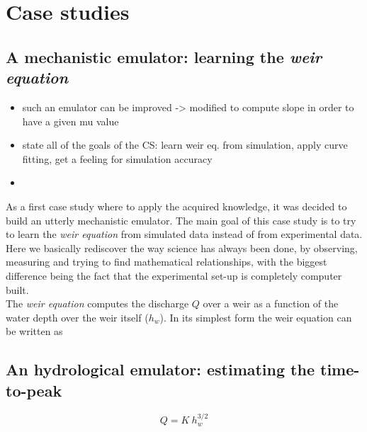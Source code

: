 \chapter{Case studies}
\label{chp:case_studies}


\section{A mechanistic emulator: learning the \emph{weir equation}}

\begin{itemize}
\itemsep0em
  \item such an emulator can be improved -> modified to compute slope in order to have a given mu value
  \item state all of the goals of the CS: learn weir eq. from simulation, apply curve fitting, get a feeling for simulation accuracy
  \item 
\end{itemize}

As a first case study where to apply the acquired knowledge, it was decided to build an utterly mechanistic emulator.
The main goal of this case study is to try to learn the \emph{weir equation} from simulated data instead of from experimental data.
Here we basically rediscover the way science has always been done, by observing, measuring and trying to find mathematical relationships, with the biggest difference being the fact that the experimental set-up is completely computer built.\\

The \emph{weir equation} computes the discharge $Q$ over a weir as a function of the water depth over the weir itself ($h_w$).
In its simplest form the weir equation can be written as

\newpage
\section{An hydrological emulator: estimating the time-to-peak}
\begin{equation}
  Q = K\: h_w^{3/2}
\end{equation}

